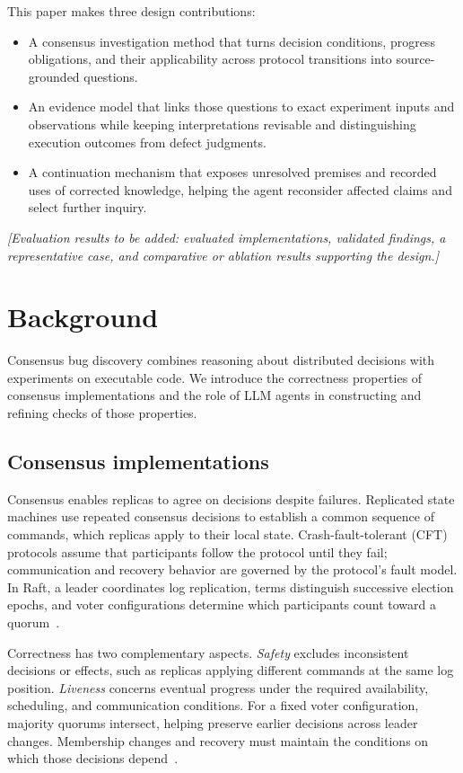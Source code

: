 \documentclass[10pt,twocolumn,letterpaper]{article}
\begin{document}
This paper makes three design contributions:
\begin{itemize}
  \item A consensus investigation method that turns decision conditions, progress obligations, and their applicability across protocol transitions into source-grounded questions.
  \item An evidence model that links those questions to exact experiment inputs and observations while keeping interpretations revisable and distinguishing execution outcomes from defect judgments.
  \item A continuation mechanism that exposes unresolved premises and recorded uses of corrected knowledge, helping the agent reconsider affected claims and select further inquiry.
\end{itemize}
\textit{[Evaluation results to be added: evaluated implementations, validated findings, a representative case, and comparative or ablation results supporting the design.]}

\section{Background}
\label{sec:motivation}

Consensus bug discovery combines reasoning about distributed decisions with experiments on executable code. We introduce the correctness properties of consensus implementations and the role of LLM agents in constructing and refining checks of those properties.

\subsection{Consensus implementations}

Consensus enables replicas to agree on decisions despite failures. Replicated state machines use repeated consensus decisions to establish a common sequence of commands, which replicas apply to their local state. Crash-fault-tolerant (CFT) protocols assume that participants follow the protocol until they fail; communication and recovery behavior are governed by the protocol's fault model. In Raft, a leader coordinates log replication, terms distinguish successive election epochs, and voter configurations determine which participants count toward a quorum~\cite{raft}.

Correctness has two complementary aspects. \emph{Safety} excludes inconsistent decisions or effects, such as replicas applying different commands at the same log position. \emph{Liveness} concerns eventual progress under the required availability, scheduling, and communication conditions. For a fixed voter configuration, majority quorums intersect, helping preserve earlier decisions across leader changes. Membership changes and recovery must maintain the conditions on which those decisions depend~\cite{raft}.
\end{document}
